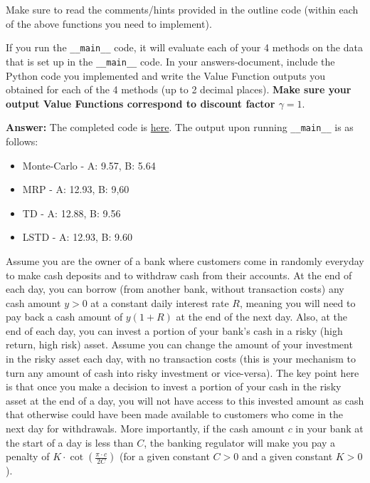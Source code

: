 \documentclass[12pt]{exam}
\begin{document}
\begin{questions}
Make sure to read the comments/hints provided in the outline code (within each of the above functions you need to implement).

If you run the \lstinline{__main__} code, it will evaluate each of your 4 methods on the data that is set up in the \lstinline{__main__} code. In your answers-document, include the Python code you implemented and write the Value Function outputs you obtained for each of the 4 methods (up to 2 decimal places). {\bf Make sure your output Value Functions correspond to discount factor $\gamma = 1$}.

{\bf Answer: } The completed code is \href{https://github.com/coverdrive/MDP-DP-RL/blob/master/src/examples/exam_problems/mrp_tdmc.py}{here}.
The output upon running \lstinline{__main__} is as follows:
\begin{itemize}
\item Monte-Carlo - A: 9.57, B: 5.64
\item MRP - A: 12.93, B: 9,60
\item TD - A: 12.88, B: 9.56
\item LSTD - A: 12.93, B: 9.60
\end{itemize}

\vspace{3mm}

\question Assume you are the owner of a bank where customers come in randomly everyday to make cash deposits and to withdraw cash from their accounts. At the end of each day, you can borrow (from another bank, without transaction costs) any cash amount $y > 0$ at a constant daily interest rate $R$, meaning you will need to pay back a cash amount of $y(1+R)$ at the end of the next day. Also, at the end of each day, you can invest a portion of your bank's cash in a risky (high return, high risk) asset. Assume you can change the amount of your investment in the risky asset each day, with no transaction costs (this is your mechanism to turn any amount of cash into risky investment or vice-versa). The key point here is that once you make a decision to invest a portion of your cash in the risky asset at the end of a day, you will not have access to this invested amount as cash that otherwise could have been made available to customers who come in the next day for withdrawals. More importantly, if the cash amount $c$ in your bank at the start of a day is less than $C$, the banking regulator will make you pay a penalty of $K \cdot \cot(\frac {\pi \cdot c}{2C})$ (for a given constant $C > 0$ and a given constant $K > 0$).


\end{questions}
\end{document}
